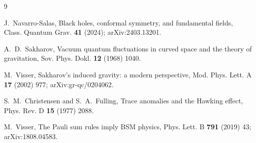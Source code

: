 \documentclass[aps,prd,twocolumn,superscriptaddress,nofootinbib,10pt]{revtex4-2}
\begin{document}
\begin{thebibliography}{9}

J.~Navarro-Salas,
\newblock Black holes, conformal symmetry, and fundamental fields,
\newblock Class. Quantum Grav. \textbf{41} (2024); arXiv:2403.13201.

A.~D.~Sakharov,
\newblock Vacuum quantum fluctuations in curved space and the theory of gravitation,
\newblock Sov. Phys. Dokl. \textbf{12} (1968) 1040.

M.~Visser,
\newblock Sakharov's induced gravity: a modern perspective,
\newblock Mod. Phys. Lett. A \textbf{17} (2002) 977; arXiv:gr-qc/0204062.

S.~M.~Christensen and S.~A.~Fulling,
\newblock Trace anomalies and the Hawking effect,
\newblock Phys. Rev. D \textbf{15} (1977) 2088.

M.~Visser,
\newblock The Pauli sum rules imply BSM physics,
\newblock Phys. Lett. B \textbf{791} (2019) 43; arXiv:1808.04583.

\end{thebibliography}
\end{document}
